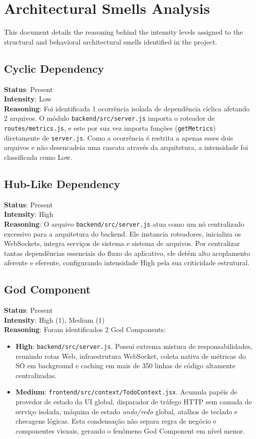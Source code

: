 \section*{Architectural Smells Analysis}

This document details the reasoning behind the intensity levels assigned to the structural and behavioral architectural smells identified in the project.

\subsection*{Cyclic Dependency}
\textbf{Status}: Present \\
\textbf{Intensity}: Low \\
\textbf{Reasoning}: Foi identificada 1 ocorrência isolada de dependência cíclica afetando 2 arquivos. O módulo \texttt{backend/src/server.js} importa o roteador de \texttt{routes/metrics.js}, e este por sua vez importa funções (\texttt{getMetrics}) diretamente de \texttt{server.js}. Como a ocorrência é restrita a apenas esses dois arquivos e não desencadeia uma cascata através da arquitetura, a intensidade foi classificada como Low.

\subsection*{Hub-Like Dependency}
\textbf{Status}: Present \\
\textbf{Intensity}: High \\
\textbf{Reasoning}: O arquivo \texttt{backend/src/server.js} atua como um nó centralizado excessivo para a arquitetura do backend. Ele instancia roteadores, inicializa os WebSockets, integra serviços de sistema e sistema de arquivos. Por centralizar tantas dependências essenciais do fluxo do aplicativo, ele detém alto acoplamento aferente e eferente, configurando intensidade High pela sua criticidade estrutural.

\subsection*{God Component}
\textbf{Status}: Present \\
\textbf{Intensity}: High (1), Medium (1) \\
\textbf{Reasoning}: 
Foram identificados 2 God Components:
\begin{itemize}
    \item \textbf{High}: \texttt{backend/src/server.js}. Possui extrema mistura de responsabilidades, reunindo rotas Web, infraestrutura WebSocket, coleta nativa de métricas do SO em background e caching em mais de 350 linhas de código altamente centralizadas.
    \item \textbf{Medium}: \texttt{frontend/src/context/TodoContext.jsx}. Acumula papéis de provedor de estado da UI global, disparador de tráfego HTTP sem camada de serviço isolada, máquina de estado \textit{undo/redo} global, atalhos de teclado e checagens lógicas. Esta condensação não separa regra de negócio e componentes visuais, gerando o fenômeno God Component em nível menor.
\end{itemize}

